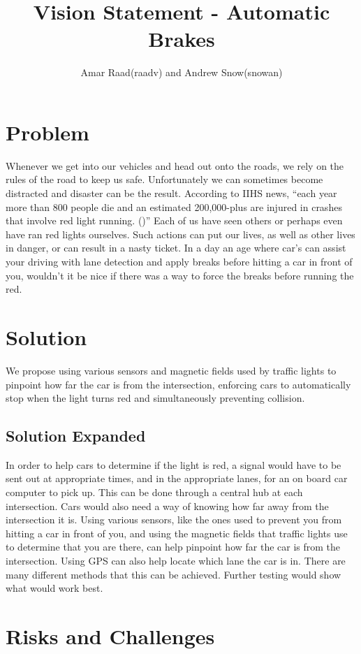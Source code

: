 \documentclass[12pt]{article}
\title{Vision Statement - Automatic Brakes}
\author{Amar Raad(raadv) and Andrew Snow(snowan)}
\begin{document}
	
\maketitle


\tableofcontents


\section{Problem}
Whenever we get into our vehicles and head out onto the roads, we rely on the rules of the road to keep us safe. Unfortunately we can sometimes become distracted and disaster can be the result. According to IIHS news, “each year more than 800 people die and an estimated 200,000-plus are injured in crashes that involve red light running. ()” Each of us have seen others or perhaps even have ran red lights ourselves. Such actions can put our lives, as well as other lives in danger, or can result in a nasty ticket. In a day an age where car’s can assist your driving with lane detection and apply breaks before hitting a car in front of you, wouldn’t it be nice if there was a way to force the breaks before running the red.
\section{Solution}
We propose using various sensors and magnetic fields used by traffic lights to pinpoint how far the car is from the intersection, enforcing cars to automatically stop when the light turns red and simultaneously preventing collision.
\subsection{Solution Expanded}
In order to help cars to determine if the light is red, a signal would have to be sent out at appropriate times, and in the appropriate lanes, for an on board car computer to pick up. This can be done through a central hub at each intersection. Cars would also need a way of knowing how far away from the intersection it is. Using various sensors, like the ones used to prevent you from hitting a car in front of you, and using the magnetic fields that traffic lights use to determine that you are there, can help pinpoint how far the car is from the intersection. Using GPS can also help locate which lane the car is in. There are many different methods that this can be achieved. Further testing would show what would work best.
\section{Risks and Challenges}
\end{document}
